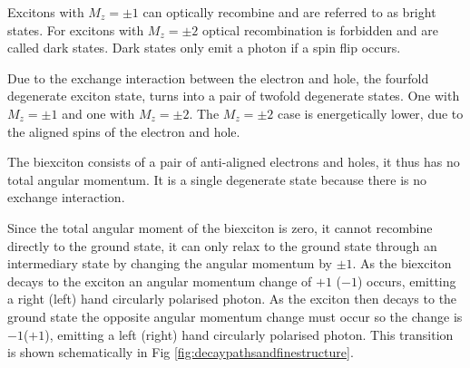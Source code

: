 \documentclass[12pt, twoside]{article}
\numberwithin{equation}{section}
\begin{document}
Excitons with $M_z = \pm 1$ can optically recombine and are referred to
as bright states. For excitons with $M_z = \pm 2$ optical recombination
is forbidden and are called dark states. Dark states only emit a photon
if a spin flip occurs.

Due to the exchange interaction between the electron and hole, the
fourfold degenerate exciton state, turns into a pair of twofold
degenerate states. One with $M_z = \pm 1$ and one with $M_z = \pm 2$.
The $M_z = \pm 2$ case is energetically lower, due to the aligned spins
of the electron and hole.

The biexciton consists of a pair of anti-aligned electrons and holes, it
thus has no total angular momentum. It is a single degenerate state
because there is no exchange interaction.

Since the total angular moment of the biexciton is zero, it cannot
recombine directly to the ground state, it can only relax to the ground
state through an intermediary state by changing the angular momentum by
$\pm 1$. As the biexciton decays to the exciton an angular momentum
change of $+ 1$ ($-1$) occurs, emitting a right (left) hand circularly
polarised photon. As the exciton then decays to the ground state the
opposite angular momentum change must occur so the change is $-1$($+1$),
emitting a left (right) hand circularly polarised photon. This
transition is shown schematically in Fig
\ref{fig:decaypathsandfinestructure}.
\end{document}
